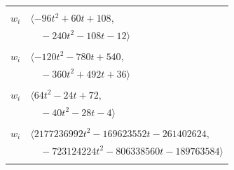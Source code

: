 \documentclass[11pt]{article}
\begin{document}
\begin{longtable}{@{}ll@{}}
\addlinespace[2pt]
\multicolumn{2}{@{}p{0.97\textwidth}@{}}{$i=4$, $D_i=1$, $\rho_{ij}$: $19{:}3, \allowbreak 24{:}3, \allowbreak 26{:}2, \allowbreak 28{:}3, \allowbreak 33{:}2, \allowbreak 35{:}3, \allowbreak 37{:}1, \allowbreak 38{:}1, \allowbreak 40{:}1, \allowbreak 41{:}2, \allowbreak 44{:}3, \allowbreak 52{:}3, \allowbreak 54{:}2, \allowbreak 60{:}2, \allowbreak 72{:}3$}\\
$w_i$ & $\langle -96t^{2}+60t+108,$\\
 & $\quad -240t^{2}-108t-12\rangle$\\
\addlinespace[2pt]
\multicolumn{2}{@{}p{0.97\textwidth}@{}}{$i=5$, $D_i=1$, $\rho_{ij}$: $1{:}1, \allowbreak 20{:}3, \allowbreak 21{:}3, \allowbreak 22{:}2, \allowbreak 26{:}3, \allowbreak 28{:}3, \allowbreak 29{:}2, \allowbreak 38{:}3, \allowbreak 39{:}2, \allowbreak 40{:}2, \allowbreak 41{:}3, \allowbreak 46{:}1, \allowbreak 47{:}2, \allowbreak 48{:}2, \allowbreak 53{:}3, \allowbreak 55{:}3, \allowbreak 56{:}2, \allowbreak 58{:}2, \allowbreak 69{:}2, \allowbreak 71{:}3, \allowbreak 73{:}1$}\\
$w_i$ & $\langle -120t^{2}-780t+540,$\\
 & $\quad -360t^{2}+492t+36\rangle$\\
\addlinespace[2pt]
\multicolumn{2}{@{}p{0.97\textwidth}@{}}{$i=6$, $D_i=1$, $\rho_{ij}$: $1{:}3, \allowbreak 9{:}3, \allowbreak 20{:}2, \allowbreak 21{:}1, \allowbreak 23{:}1, \allowbreak 26{:}3, \allowbreak 35{:}2, \allowbreak 41{:}2, \allowbreak 46{:}3, \allowbreak 47{:}3, \allowbreak 49{:}3, \allowbreak 60{:}3, \allowbreak 73{:}2$}\\
$w_i$ & $\langle 64t^{2}-24t+72,$\\
 & $\quad -40t^{2}-28t-4\rangle$\\
\addlinespace[2pt]
\multicolumn{2}{@{}p{0.97\textwidth}@{}}{$i=7$, $D_i=65536$, $e_i=3$, $\rho_{ij}$: $1{:}2, \allowbreak 21{:}1, \allowbreak 24{:}2, \allowbreak 27{:}2, \allowbreak 28{:}1, \allowbreak 34{:}2, \allowbreak 36{:}1, \allowbreak 40{:}2, \allowbreak 46{:}3, \allowbreak 48{:}1, \allowbreak 52{:}3, \allowbreak 55{:}1, \allowbreak 56{:}3, \allowbreak 60{:}2, \allowbreak 61{:}1, \allowbreak 64{:}3, \allowbreak 65{:}3, \allowbreak 71{:}1, \allowbreak 77{:}3$}\\
$w_i$ & $\langle 2177236992t^{2}-169623552t-261402624,$\\
 & $\quad -723124224t^{2}-806338560t-189763584\rangle$\\
\addlinespace[2pt]
\multicolumn{2}{@{}p{0.97\textwidth}@{}}{$i=8$, $D_i=4$, $e_i=2$, $\rho_{ij}$: $0{:}3, \allowbreak 13{:}2, \allowbreak 17{:}2, \allowbreak 20{:}2, \allowbreak 22{:}1, \allowbreak 32{:}3, \allowbreak 34{:}1, \allowbreak 39{:}2, \allowbreak 43{:}2, \allowbreak 51{:}1, \allowbreak 55{:}1, \allowbreak 63{:}2, \allowbreak 65{:}3, \allowbreak 70{:}1, \allowbreak 77{:}3$}\\

\end{longtable}
\end{document}
